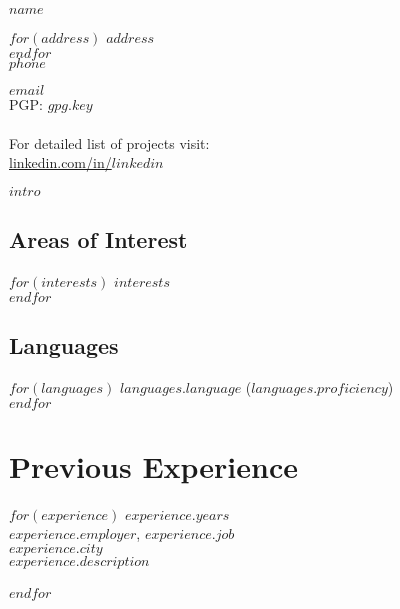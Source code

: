 \documentclass[$fontsize$, a4paper]{article}
\begin{document}
{\LARGE $name$}\\[.2cm]


\begin{multicols}{2}

$for(address)$
$address$\\
$endfor$\\
$phone$

\columnbreak

\href{mailto:$email$}{$email$}\\
PGP: \href{$gpg.url$}{$gpg.key$}\\\\

For detailed list of projects visit:\\
\href{http://linkedin.com/in/$linkedin$}{linkedin.com/in/$linkedin$}

\end{multicols}

\vspace{15pt}

$intro$


\begin{multicols}{2}

\subsection*{Areas of Interest}
$for(interests)$
$interests$\\
$endfor$

\columnbreak

\subsection*{Languages}
$for(languages)$
\emph{$languages.language$} ($languages.proficiency$)\\
$endfor$

\end{multicols}

\vspace{-10pt}

\section*{Previous Experience}
\noindent
$for(experience)$
\footnotesize{$experience.years$}\\
\textsc{$experience.employer$}, \emph{$experience.job$}\\
$experience.city$\\[.2cm]
$experience.description$\\\\
$endfor$
\end{document}
